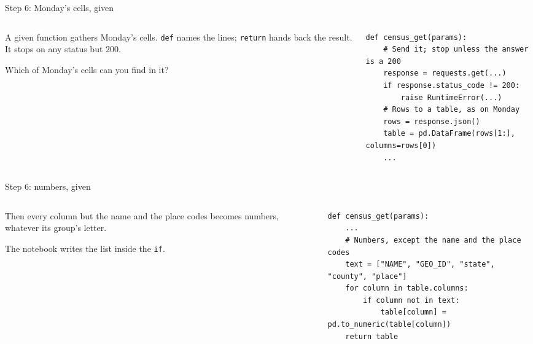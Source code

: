 \documentclass[9pt,aspectratio=169]{beamer}
\begin{document}
\begin{frame}[fragile]{Step 6: Monday's cells, given}
    \begin{columns}[T]
        \begin{column}{0.37\textwidth}
            A given function gathers Monday's cells. \texttt{def} names the lines; \texttt{return} hands back the result. It stops on any status but 200.

            \medskip
            Which of Monday's cells can you find in it?
        \end{column}
        \begin{column}{0.6\textwidth}
\begin{lstlisting}
def census_get(params):
    # Send it; stop unless the answer is a 200
    response = requests.get(...)
    if response.status_code != 200:
        raise RuntimeError(...)
    # Rows to a table, as on Monday
    rows = response.json()
    table = pd.DataFrame(rows[1:], columns=rows[0])
    ...
\end{lstlisting}
        \end{column}
    \end{columns}
\end{frame}

\begin{frame}[fragile]{Step 6: numbers, given}
    \begin{columns}[T]
        \begin{column}{0.37\textwidth}
            Then every column but the name and the place codes becomes numbers, whatever its group's letter.

            \medskip
            The notebook writes the list inside the \texttt{if}.
        \end{column}
        \begin{column}{0.6\textwidth}
\begin{lstlisting}
def census_get(params):
    ...
    # Numbers, except the name and the place codes
    text = ["NAME", "GEO_ID", "state", "county", "place"]
    for column in table.columns:
        if column not in text:
            table[column] = pd.to_numeric(table[column])
    return table
\end{lstlisting}
        \end{column}
    \end{columns}
\end{frame}
\end{document}
